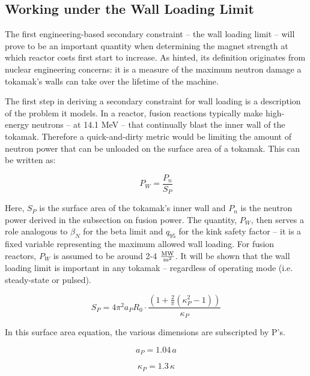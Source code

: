 \subsection{Working under the Wall Loading Limit}

The first engineering-based secondary constraint -- the wall loading limit -- will prove to be an important quantity when determining the magnet strength at which reactor costs first start to increase. As hinted, its definition originates from nuclear engineering concerns: it is a measure of the maximum neutron damage a tokamak's walls can take over the lifetime of the machine.

The first step in deriving a secondary constraint for wall loading is a description of the problem it models. In a reactor, fusion reactions typically make high-energy neutrons -- at 14.1 MeV -- that continually blast the inner wall of the tokamak. Therefore a quick-and-dirty metric would be limiting the amount of neutron power that can be unloaded on the surface area of a tokamak. This can be written as:

\begin{equation}
	P_W = \frac{ P_n }{ S_P }
\end{equation}

Here, $S_P$ is the surface area of the tokamak's inner wall and $P_n$ is the neutron power derived in the subsection on fusion power. The quantity, $P_W$, then serves a role analogous to $\beta_N$ for the beta limit and $q_{95}$ for the kink safety factor -- it is a fixed variable representing the maximum allowed wall loading. For fusion reactors, $P_W$ is assumed to be around 2-4 $\frac{\textnormal{MW}}{\textnormal{m}^2}$. It will be shown that the wall loading limit is important in any tokamak -- regardless of operating mode (i.e. steady-state or pulsed).

\begin{equation}
	S_P = 4 \pi^2 a_P R_0 \cdot \frac{ \left( 1 + \frac{2}{\pi} \left( \kappa_P^2 -1 \right) \right) }{ \kappa_P }
\end{equation}

In this surface area equation, the various dimensions are subscripted by P's.

\begin{equation}
	a_P = 1.04 \, a
\end{equation}

\begin{equation}
	\kappa_P = 1.3 \, \kappa
\end{equation}

